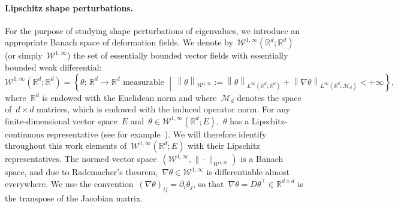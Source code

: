 \documentclass[a4]{article}
\newcommand{\R}{\mathbb{R}}
\newcommand{\1}{\mathbbm 1}
\newcommand{\Winf}{{{\cW}^{1,\infty}}}
\newcommand{\cW}{\mathcal{W}}
\begin{document}
        \paragraph{Lipschitz shape perturbations.}
        For the purpose of studying shape perturbations of eigenvalues, we introduce an appropriate Banach space of deformation fields.
        We denote by~$\Winf(\R^d;\R^d)$ (or simply~$\Winf$) the set of essentially bounded vector fields with essentially bounded weak differential:
        \begin{equation}
            \label{eq:lipschitz_functions}
            \Winf(\R^d;\R^d) = \left\{\theta:\,\R^d\to\R^d\text{ measurable } \middle|\,\left\|\theta\right\|_{\Winf} :=\left\|\theta\right\|_{L^{\infty}\left(\R^d;\R^d\right)} + \left\|\nabla\theta\right\|_{L^{\infty}\left(\R^d;\mathcal M_d\right)} < +\infty\right\},
        \end{equation}
        where~$\R^d$ is endowed with the Euclidean norm and where~$\mathcal M_d$ denotes the space of~$d\times d$ matrices, which is endowed with the induced operator norm.
        For any finite-dimensional vector space~$E$ and~$\theta\in \Winf(\R^d;E)$,~$\theta$ has a Lipschitz-continuous representative (see for example~\cite[Section 5.8.2.b, Theorem 4]{E22}). We will therefore identify throughout this work elements of~$\Winf(\R^d;E)$ with their Lipschitz representatives.
        The normed vector space~$(\Winf,\|\cdot\|_{\Winf})$ is a Banach space, and due to Rademacher's theorem,~$\nabla\theta\in \Winf$ is differentiable almost everywhere.
        We use the convention~$(\nabla \theta)_{ij} = \partial_i \theta_j$, so that~$\nabla \theta = D\theta^\top \in \R^{d\times d}$ is the transpose of the Jacobian matrix.
\end{document}
